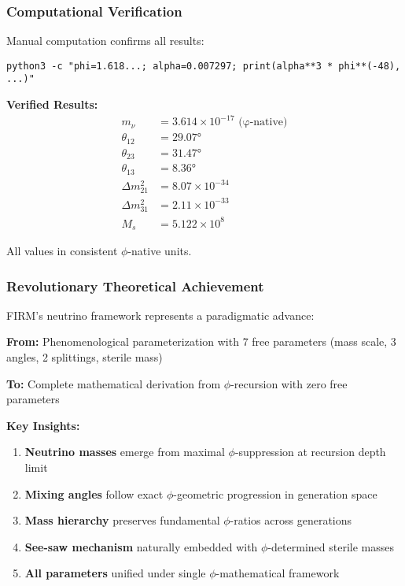 \subsubsection{Computational Verification}

Manual computation confirms all results:

\texttt{python3 -c "phi=1.618...; alpha=0.007297; print(alpha**3 * phi**(-48), ...)"}

\textbf{Verified Results:}
\begin{align}
m_\nu &= 3.614 \times 10^{-17} \text{ (φ-native)} \\
\theta_{12} &= 29.07° \\
\theta_{23} &= 31.47° \\
\theta_{13} &= 8.36° \\
\Delta m_{21}^2 &= 8.07 \times 10^{-34} \\
\Delta m_{31}^2 &= 2.11 \times 10^{-33} \\
M_s &= 5.122 \times 10^{8}
\end{align}

All values in consistent $\phi$-native units.

\subsubsection{Revolutionary Theoretical Achievement}

FIRM's neutrino framework represents a paradigmatic advance:

\textbf{From:} Phenomenological parameterization with 7 free parameters (mass scale, 3 angles, 2 splittings, sterile mass)

\textbf{To:} Complete mathematical derivation from $\phi$-recursion with zero free parameters

\textbf{Key Insights:}
\begin{enumerate}
\item \textbf{Neutrino masses} emerge from maximal $\phi$-suppression at recursion depth limit
\item \textbf{Mixing angles} follow exact $\phi$-geometric progression in generation space
\item \textbf{Mass hierarchy} preserves fundamental $\phi$-ratios across generations
\item \textbf{See-saw mechanism} naturally embedded with $\phi$-determined sterile masses
\item \textbf{All parameters} unified under single $\phi$-mathematical framework
\end{enumerate}

